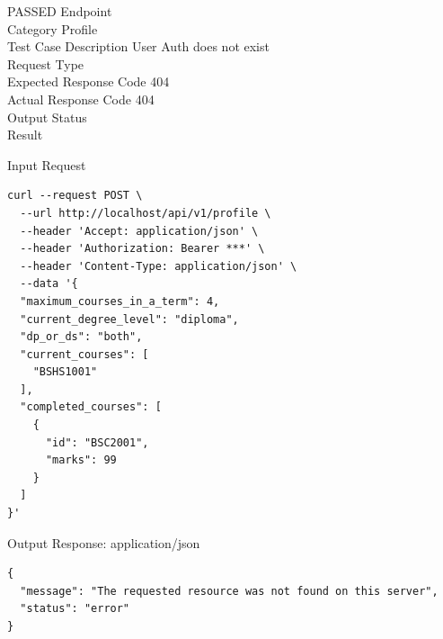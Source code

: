 \begin{testcase}{21}{PASSED}
Endpoint \hfill {}\\
Category \hfill Profile\\
Test Case Description \hfill User Auth does not exist\\

Request Type    \hfill {}\\
Expected Response Code    \hfill 404\\
Actual Response Code    \hfill 404\\

Output Status \hfill {}\\
Result \hfill {}

\begin{ipblock}{Input Request}
\begin{verbatim}
curl --request POST \
  --url http://localhost/api/v1/profile \
  --header 'Accept: application/json' \
  --header 'Authorization: Bearer ***' \
  --header 'Content-Type: application/json' \
  --data '{
  "maximum_courses_in_a_term": 4,
  "current_degree_level": "diploma",
  "dp_or_ds": "both",
  "current_courses": [
    "BSHS1001"
  ],
  "completed_courses": [
    {
      "id": "BSC2001",
      "marks": 99
    }
  ]
}'
\end{verbatim}
\end{ipblock}

\begin{opblock}{Output Response: application/json}
\begin{verbatim}
{
  "message": "The requested resource was not found on this server",
  "status": "error"
}
\end{verbatim}
\end{opblock}
\end{testcase}


